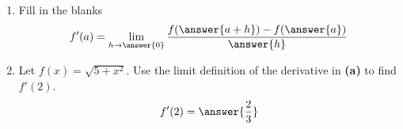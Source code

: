 \documentclass{ximera}
\begin{document}
\begin{exercise}


\begin{enumerate}[label=\bf{(\alph*)},align=left]
\item Fill in the blanks
\[
f'(a)=\lim_{h\to\answer{0}}\dfrac{f(\answer{a+h})-f(\answer{a})}{\answer{h}}
\]
\item Let $f(x)=\sqrt{5+x^2}$. Use the limit definition of the derivative in \textbf{(a)} to find $f'(2)$.
\[
f'(2)=\answer{\frac{2}{3}}
\]
\end{enumerate}


\end{exercise}
\end{document}
